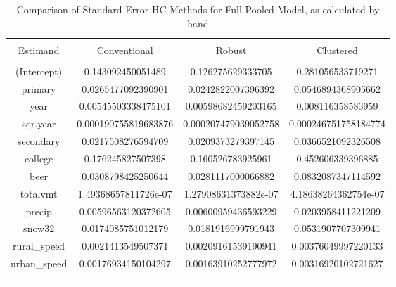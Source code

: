 \documentclass{article}
\begin{document}
\begin{table}[!htbp] \centering 
  \caption{Comparison of Standard Error HC Methods for Full Pooled Model, as calculated by hand} 
  \label{tab:3b2} 
\footnotesize 
\begin{tabular}{@{\extracolsep{5pt}} cccc} 
\\[-1.8ex]\hline \\[-1.8ex] 
Estimand & Conventional & Robust & Clustered \\ 
\hline 
\hline \\[-1.8ex] 
(Intercept) & 0.143092450051489 & 0.126275629333705 & 0.281056533719271 \\ 
primary & 0.0265477092390901 & 0.0242822007396392 & 0.0546894368905662 \\ 
year & 0.00545503338475101 & 0.00598682459203165 & 0.008116358583959 \\ 
sqr.year & 0.000190755819683876 & 0.000207479039052758 & 0.000246751758184774 \\ 
secondary & 0.0217508276594709 & 0.0209373279397145 & 0.0366521092326508 \\ 
college & 0.176245827507398 & 0.160526783925961 & 0.452606339396885 \\ 
beer & 0.0308798425250644 & 0.0281117000066882 & 0.0832087347114592 \\ 
totalvmt & 1.49368657811726e-07 & 1.27908631373882e-07 & 4.18638264362754e-07 \\ 
precip & 0.00596563120372605 & 0.00600959436593229 & 0.0203958411221209 \\ 
snow32 & 0.0174085751012179 & 0.0181916999791943 & 0.0531907707309941 \\ 
rural\_speed & 0.0021413549507371 & 0.00209161539190941 & 0.00376049997220133 \\ 
urban\_speed & 0.00176934150104297 & 0.00163910252777972 & 0.00316920102721627 \\ 
\hline 
\hline \\[-1.8ex] 
\normalsize 
\end{tabular} 
\end{table} 
\end{document}
